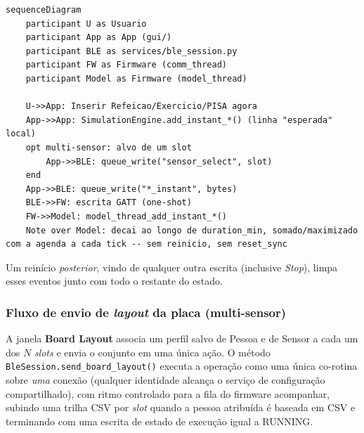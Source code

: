 \begin{lstlisting}[language=mermaid,caption={Fluxo de eventos pontuais: injeção sem reinício em uma simulação em andamento.},label={lst:fluxo-pontual}]
sequenceDiagram
    participant U as Usuario
    participant App as App (gui/)
    participant BLE as services/ble_session.py
    participant FW as Firmware (comm_thread)
    participant Model as Firmware (model_thread)

    U->>App: Inserir Refeicao/Exercicio/PISA agora
    App->>App: SimulationEngine.add_instant_*() (linha "esperada" local)
    opt multi-sensor: alvo de um slot
        App->>BLE: queue_write("sensor_select", slot)
    end
    App->>BLE: queue_write("*_instant", bytes)
    BLE->>FW: escrita GATT (one-shot)
    FW->>Model: model_thread_add_instant_*()
    Note over Model: decai ao longo de duration_min, somado/maximizado com a agenda a cada tick -- sem reinicio, sem reset_sync
\end{lstlisting}

Um reinício \emph{posterior}, vindo de qualquer outra escrita (inclusive
\emph{Stop}), limpa esses eventos junto com todo o restante do estado.

\subsubsection{Fluxo de envio de \textit{layout} da placa (multi-sensor)}
\label{sec:fluxo-layout}

A janela \textbf{Board Layout} associa um perfil salvo de Pessoa e de Sensor a
cada um dos $N$ \textit{slots} e envia o conjunto em uma única ação. O método
\texttt{BleSession.send\_board\_layout()} executa a operação como uma única
co-rotina sobre \emph{uma} conexão (qualquer identidade alcança o serviço de
configuração compartilhado), com ritmo controlado para a fila do firmware
acompanhar, subindo uma trilha CSV por \textit{slot} quando a pessoa
atribuída é baseada em CSV e terminando com uma escrita de estado de execução
igual a RUNNING.

